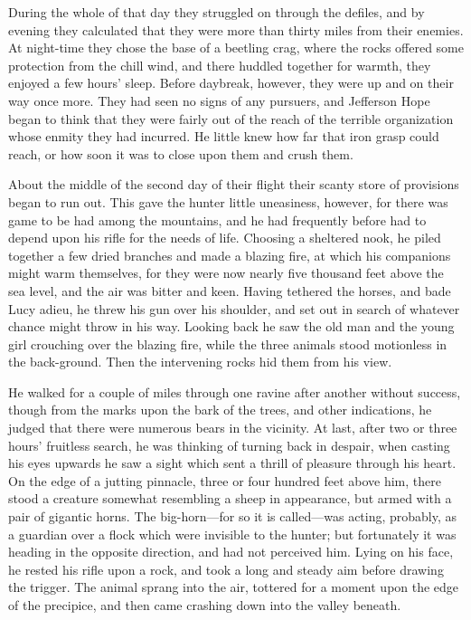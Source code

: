 \documentclass[12pt,english,oneside]{book}
\newcommand{\mdsh}[1]{\mbox{#1}\linebreak[1]}
\begin{document}
During the whole of that day they struggled on through the defiles,
and by evening they calculated that they were more than thirty miles
from their enemies. At night-time they chose the base of a beetling
crag, where the rocks offered some protection from the chill wind,
and there huddled together for warmth, they enjoyed a few hours' sleep.
Before daybreak, however, they were up and on their way once more.
They had seen no signs of any pursuers, and Jefferson Hope began to
think that they were fairly out of the reach of the terrible organization
whose enmity they had incurred. He little knew how far that iron grasp
could reach, or how soon it was to close upon them and crush them.

About the middle of the second day of their flight their scanty store
of provisions began to run out. This gave the hunter little uneasiness,
however, for there was game to be had among the mountains, and he
had frequently before had to depend upon his rifle for the needs of
life. Choosing a sheltered nook, he piled together a few dried branches
and made a blazing fire, at which his companions might warm themselves,
for they were now nearly five thousand feet above the sea level, and
the air was bitter and keen. Having tethered the horses, and bade
Lucy adieu, he threw his gun over his shoulder, and set out in search
of whatever chance might throw in his way. Looking back he saw the
old man and the young girl crouching over the blazing fire, while
the three animals stood motionless in the back-ground. Then the intervening
rocks hid them from his view.

He walked for a couple of miles through one ravine after another without
success, though from the marks upon the bark of the trees, and other
indications, he judged that there were numerous bears in the vicinity.
At last, after two or three hours' fruitless search, he was thinking
of turning back in despair, when casting his eyes upwards he saw a
sight which sent a thrill of pleasure through his heart. On the edge
of a jutting pinnacle, three or four hundred feet above him, there
stood a creature somewhat resembling a sheep in appearance, but armed
with a pair of gigantic horns. The big-horn\mdsh{---}for so it is
called\mdsh{---}was acting, probably, as a guardian over a flock
which were invisible to the hunter; but fortunately it was heading
in the opposite direction, and had not perceived him. Lying on his
face, he rested his rifle upon a rock, and took a long and steady
aim before drawing the trigger. The animal sprang into the air, tottered
for a moment upon the edge of the precipice, and then came crashing
down into the valley beneath.
\end{document}

